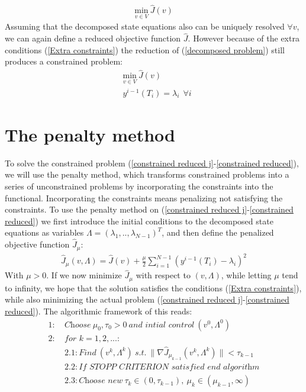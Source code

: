 \begin{align*}
\underset{v\in V}{\text{min}} \ \hat J(v)
\end{align*} 
Assuming that the decomposed state equations also can be uniquely resolved $\forall v$, we can again define a reduced objective function  $\hat{J}$. However because of the extra conditions (\ref{Extra constraints}) the reduction of (\ref{decomposed problem}) still produces a constrained problem:
\begin{align}
&\underset{v\in V}{\text{min}} \ \hat J(v) \label{constrained reduced j}\\
&y^{i-1}(T_i)=\lambda_i \ \ \forall i \label{constrained reduced}
\end{align} 
\section{The penalty method} \label{penalty_sec}
To solve the constrained problem (\ref{constrained reduced j}-\ref{constrained reduced}), we will use the penalty method, which transforms constrained problems into a series of unconstrained problems by incorporating the constraints into the functional. Incorporating the constraints means penalizing not satisfying the constraints. To use the penalty method on (\ref{constrained reduced j}-\ref{constrained reduced}) we first introduce the initial conditions to the decomposed state equations as variables $\Lambda = (\lambda_1,..,\lambda_{N-1})^T$, and then define the penalized objective function $\hat J_{\mu}$:
\begin{align}
\hat J_{\mu}(v,\Lambda) = \hat J(v) + \frac{\mu}{2}\sum_{i=1}^{N-1}(y^{i-1}(T_i)-\lambda_i)^2 \label{pen_obj_J}
\end{align}
With $\mu>0$. If we now minimize $\hat{J}_{\mu}$ with respect to $(v,\Lambda)$, while letting $\mu$ tend to infinity, we hope that the solution satisfies the conditions (\ref{Extra constraints}), while also minimizing the actual problem (\ref{constrained reduced j}-\ref{constrained reduced}). The algorithmic framework of this reads:
\begin{align*}
1: \ &\textit{Choose} \ \mu_0,\tau_0>0 \ \textit{and intial control} \ (v^0,\Lambda^0) \\
2: \ &\textit{for $k=1,2,...$: } \\
&2.1:\textit{Find} \ (v^k,\Lambda^k) \ \textit{s.t.} \ \parallel\nabla \hat J_{\mu_{k-1}}(v^k,\Lambda^k)\parallel<\tau_{k-1} \\
&2.2:\textit{If STOPP CRITERION satisfied end algorithm} \\
&2.3:\textit{Choose new} \ \tau_k\in(0,\tau_{k-1}),\ \mu_k\in(\mu_{k-1},\infty) 
\end{align*}

